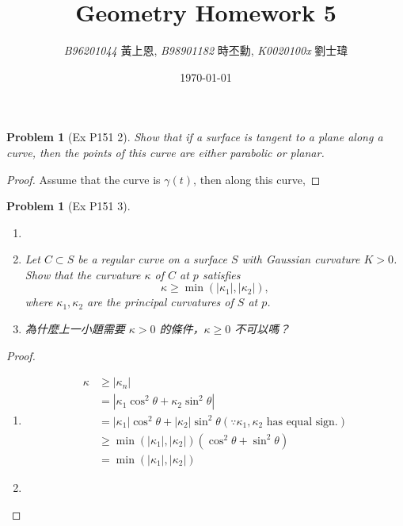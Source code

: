 \documentclass[10pt,a4paper]{article}
\newcommand{\LiHei}{\CJKfamily{lh}}
\newcounter{theProblemCounter}
\newtheorem{problem}[theProblemCounter]{Problem}
\begin{document}
\title{{Geometry Homework 5}}
\author{{\it{B96201044}} {\LiHei 黃上恩}, {\it{B98901182}} {\LiHei 時丕勳}, {\it{K0020100x}} {\LiHei 劉士瑋}}
\date{\today}
\maketitle

\newcommand{\bx}{\mathbb{X}}
\setcounter{theProblemCounter}{0}
\begin{problem}[Ex P151 2]
Show that if a surface is tangent to a plane along a curve, then the points of this curve are either parabolic or planar.
\end{problem}
\begin{proof}
Assume that the curve is $\gamma(t)$, then along this curve, 
\end{proof}

\setcounter{theProblemCounter}{2}
\begin{problem}[Ex P151 3]
\begin{enumerate}
\item[]
\item[(a)] Let $C\subset S$ be a regular curve on a surface $S$ with Gaussian curvature $K > 0$. Show that the curvature $\kappa$ of $C$ at $p$ satisfies \[ \kappa\ge \min(|\kappa_1|, |\kappa_2|),\] where $\kappa_1, \kappa_2$ are the principal curvatures of $S$ at $p$.
\item[(b)] 為什麼上一小題需要 $\kappa>0$ 的條件，$\kappa\ge 0$ 不可以嗎？ %
\end{enumerate}
\end{problem}
\begin{proof}
\begin{enumerate}
\item[(a)]
\begin{align*}
\kappa&\ge |\kappa_n|\\
&=|\kappa_1\cos^2\theta+\kappa_2\sin^2\theta|\\
&=|\kappa_1|\cos^2\theta+|\kappa_2|\sin^2\theta (\because\kappa_1, \kappa_2\textrm{ has equal sign.})\\
&\ge \min(|\kappa_1|, |\kappa_2|)(\cos^2\theta+\sin^2\theta)\\
&=\min(|\kappa_1|, |\kappa_2|)
\end{align*}
\item[(b)]
\end{enumerate}
\end{proof}
\end{document}
